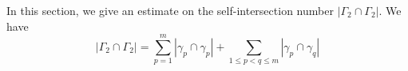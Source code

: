\documentclass[11pt, a4paper]{article}
\newtheorem{thm}{Theorem}[section]
\theoremstyle{definition}
\theoremstyle{remark}
\newcommand{\abs}[1]{\left| #1 \right|}
\newcommand{\bracket}[1]{\left( #1 \right)}
\begin{document}

In this section, we give an estimate on the self-intersection number $|\Gamma_2\cap\Gamma_2|$. We have
$$\abs{\Gamma_2\cap\Gamma_2}=\sum_{p=1}^{m}\abs{\gamma_p\cap\gamma_p}+\sum_{1\leqslant p<q\leqslant m}\abs{\gamma_p\cap\gamma_q}$$
\end{document}
